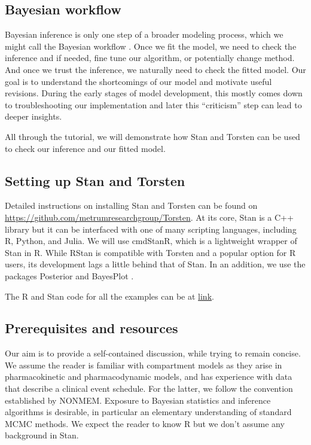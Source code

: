 \subsection{Bayesian workflow}

Bayesian inference is only one step of a broader modeling process, which we might call the Bayesian workflow \cite{Betancourt:2018, Gelman:2020}.
Once we fit the model, we need to check the inference and if needed, fine tune our algorithm, or potentially change method.
And once we trust the inference, we naturally need to check the fitted model.
Our goal is to understand the shortcomings of our model and motivate useful revisions.
During the early stages of model development, this mostly comes down to troubleshooting our implementation and later this ``criticism'' step can lead to deeper insights.

All through the tutorial, we will demonstrate how Stan and Torsten can be used to check our inference and our fitted model.

\subsection{Setting up Stan and Torsten}

Detailed instructions on installing Stan and Torsten can be found on \url{https://github.com/metrumresearchgroup/Torsten}.
At its core, Stan is a C++ library but it can be interfaced with one of many scripting languages, including R, Python, and Julia.
We will use cmdStanR, which is a lightweight wrapper of Stan in R.
While RStan is compatible with Torsten and a popular option for R users, its development lags a little behind that of Stan.
In an addition, we use the packages Posterior \cite{author:0000} and BayesPlot \cite{author:0000}.

The R and Stan code for all the examples can be at \url{link}.

 \subsection{Prerequisites and resources}
 
 Our aim is to provide a self-contained discussion, while trying to remain concise.
 We assume the reader is familiar with compartment models as they arise in pharmacokinetic and pharmacodynamic models, and has experience with data that describe a clinical event schedule.
 For the latter, we follow the convention established by NONMEM.
 Exposure to Bayesian statistics and inference algorithms is desirable, in particular an elementary understanding of standard MCMC methods.
 We expect the reader to know R but we don't assume any background in Stan.
 
